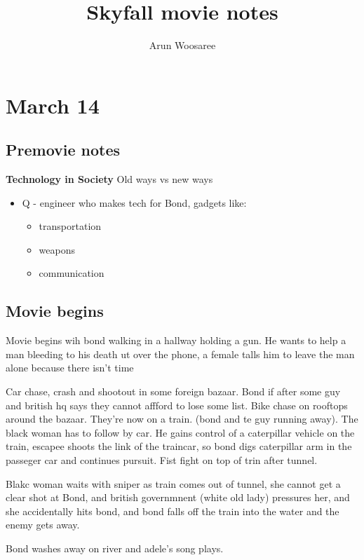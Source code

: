 \documentclass{article}
\title{Skyfall movie notes}
\author{Arun Woosaree}
\begin{document}
  \maketitle %

  \section{March 14}
  \subsection{Premovie notes}
  \textbf{Technology in Society}
    Old ways vs new ways
  \begin{itemize}
    \item Q - engineer who makes tech for Bond, gadgets like:
            \begin{itemize}
              \item transportation
              \item weapons
              \item communication
            \end{itemize}
  \end{itemize}

  \subsection{Movie begins}
  Movie begins wih bond walking in a hallway holding a gun.
  He wants to help a man bleeding to his death ut over the phone, a female talls him
  to leave the man alone because there isn't time

  Car chase, crash and shootout in some foreign bazaar. Bond if after some guy
  and british hq says they cannot affford to lose some list. Bike chase on rooftops
  around the bazaar. They're now on a train. (bond and te guy running away). The black woman has to follow
  by car. He gains control of a caterpillar vehicle on the train, escapee shoots the link of the traincar,
  so bond digs caterpillar arm in the passeger car and continues pursuit. Fist fight on top of trin after tunnel.

  Blakc woman waits with sniper as train comes out of tunnel, she cannot get a clear shot at Bond, and
  british governmnent (white old lady) pressures her, and she accidentally hits bond, and bond falls off the train into the water
  and the enemy gets away.

  Bond washes away on river and adele's song plays.
\end{document}
